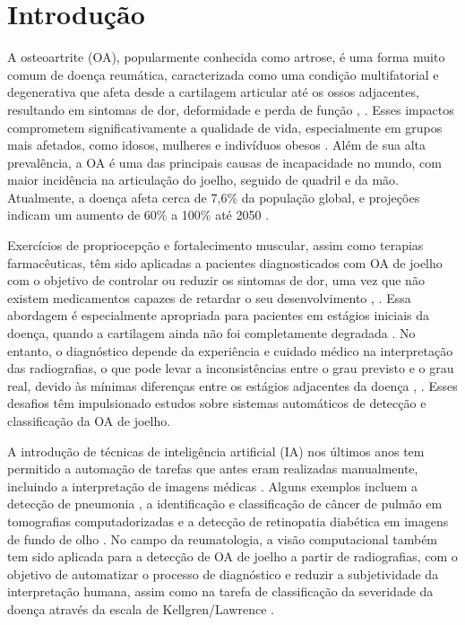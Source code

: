 
\chapter[Introdução]{Introdução}

A osteoartrite (OA), popularmente conhecida como artrose, é uma forma muito comum de doença reumática, caracterizada como uma condição multifatorial e degenerativa que afeta desde a cartilagem articular até os ossos adjacentes, resultando em sintomas de dor, deformidade e perda de função \cite{Kraus2015}, \cite{PACCA2018}. Esses impactos comprometem significativamente a qualidade de vida, especialmente em grupos mais afetados, como idosos, mulheres e indivíduos obesos \cite{PACCA2018}. Além de sua alta prevalência, a OA é uma das principais causas de incapacidade no mundo, com maior incidência na articulação do joelho, seguido de quadril e da mão. Atualmente, a doença afeta cerca de 7,6\% da população global, e projeções indicam um aumento de 60\% a 100\% até 2050 \cite{COURTIES20241397}.

Exercícios de propriocepção e fortalecimento muscular, assim como terapias farmacêuticas, têm sido aplicadas a pacientes diagnosticados com OA de joelho com o objetivo de controlar ou reduzir os sintomas de dor, uma vez que não existem medicamentos capazes de retardar o seu desenvolvimento \cite{Sardim2020}, \cite{Lin2009}. Essa abordagem é especialmente apropriada para pacientes em estágios iniciais da doença, quando a cartilagem ainda não foi completamente degradada \cite{Kanamoto2020}. No entanto, o diagnóstico depende da experiência e cuidado médico na interpretação das radiografias, o que pode levar a inconsistências entre o grau previsto e o grau real, devido às mínimas diferenças entre os estágios adjacentes da doença \cite{KELLGREN1957}, \cite{Mohammed2023}. Esses desafios têm impulsionado estudos sobre sistemas automáticos de detecção e classificação da OA de joelho.

A introdução de técnicas de inteligência artificial (IA) nos últimos anos tem permitido a automação de tarefas que antes eram realizadas manualmente, incluindo a interpretação de imagens médicas \cite{WANG2024103201}. Alguns exemplos incluem a detecção de pneumonia \cite{9077899}, a identificação e classificação de câncer de pulmão em tomografias computadorizadas \cite{8697352} e a detecção de retinopatia diabética em imagens de fundo de olho \cite{Dai2021}. No campo da reumatologia, a visão computacional também tem sido aplicada para a detecção de OA de joelho a partir de radiografias, com o objetivo de automatizar o processo de diagnóstico e reduzir a subjetividade da interpretação humana, assim como na tarefa de classificação da severidade da doença através da escala de Kellgren/Lawrence \cite{Mohammed2023}.

